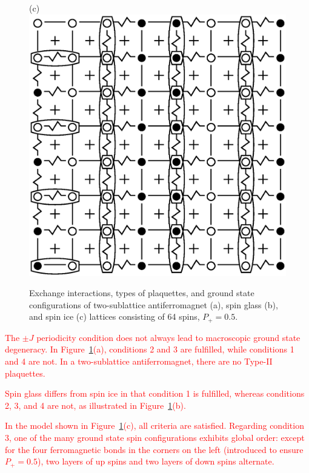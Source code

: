 \documentclass[preprint,12pt]{elsarticle}
\begin{document}
\begin{figure}[H]
\begin{minipage}[h]{0.3\linewidth}
		\end{minipage}
		\hfill
		\begin{minipage}[h]{0.3\linewidth}
			\centering(c)
			\includegraphics[width=1\linewidth]{pictures/SI_64_J0}
		\end{minipage}
		\hfill
		\caption{Exchange interactions, types of plaquettes, and ground state configurations of two-sublattice antiferromagnet (a), spin glass (b), and spin ice (c) lattices consisting of 64 spins, $P_+ = 0.5$.}
		\label{fig:cell_SI_SG_64}
		
	\end{figure}
	

	\textcolor{red}{The $\pm J$ periodicity condition does not always lead to macroscopic ground state degeneracy. In Figure~\ref{fig:cell_SI_SG_64}(a), conditions 2 and 3 are fulfilled, while conditions 1 and 4 are not. In a two-sublattice antiferromagnet, there are no Type-II plaquettes.}
	
	\textcolor{red}{Spin glass differs from spin ice in that condition 1 is fulfilled, whereas conditions 2, 3, and 4 are not, as illustrated in Figure~\ref{fig:cell_SI_SG_64}(b).}

	\textcolor{red}{In the model shown in Figure~\ref{fig:cell_SI_SG_64}(c), all criteria are satisfied. Regarding condition 3, one of the many ground state spin configurations exhibits global order: except for the four ferromagnetic bonds in the corners on the left (introduced to ensure $P_+ = 0.5$), two layers of up spins and two layers of down spins alternate.}
\end{document}
